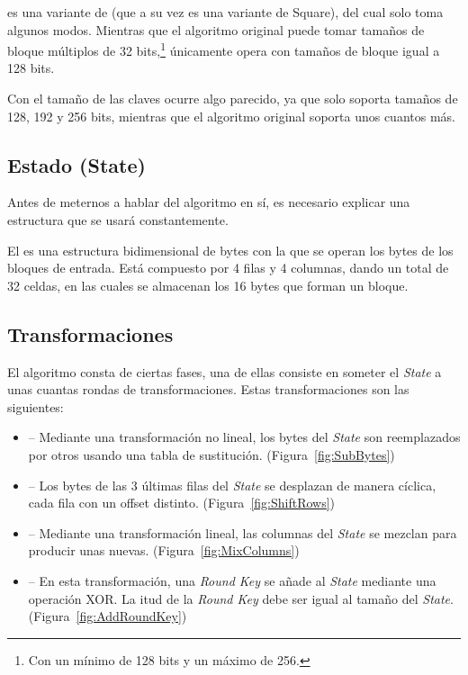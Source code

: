   es una variante de  (que a su vez es una variante de Square), del cual solo toma algunos modos.
 Mientras que el algoritmo original puede tomar tamaños de bloque múltiplos de 32 bits,\footnote{Con un mínimo de 128 bits y un máximo de 256.}
  únicamente opera con tamaños de bloque igual a 128 bits.

 Con el tamaño de las claves ocurre algo parecido, ya que  solo soporta tamaños de 128, 192 y 256 bits,
 mientras que el algoritmo original soporta unos cuantos más. \emph{\parencite{Reference25}}

 \subsection{Estado (State)}

 Antes de meternos a hablar del algoritmo en sí, es necesario explicar una estructura que se usará
 constantemente.

 El  es una estructura bidimensional de bytes con la que se operan los bytes
 de los bloques de entrada. Está compuesto por 4 filas y 4 columnas, dando un total de 32 celdas,
 en las cuales se almacenan los 16 bytes que forman un bloque. \emph{\parencite{Reference26}}

 \subsection{Transformaciones}

 El algoritmo consta de ciertas fases, una de ellas consiste en someter el \emph{State}
 a unas cuantas rondas de transformaciones. Estas transformaciones son las siguientes:

 \begin{itemize}
 \item {} -- Mediante una transformación no lineal,
 los bytes del \emph{State} son reemplazados por otros usando una tabla de sustitución.
 (Figura~\ref{fig:SubBytes})

 \item {} -- Los bytes de las 3 últimas filas del \emph{State}
 se desplazan de manera cíclica, cada fila con un offset distinto.
 (Figura~\ref{fig:ShiftRows})

 \item {} -- Mediante una transformación lineal,
 las columnas del \emph{State} se mezclan para producir unas nuevas.
 (Figura~\ref{fig:MixColumns})

 \item {} -- En esta transformación, una \emph{Round Key} se
 añade al \emph{State} mediante una operación XOR.
 La itud de la \emph{Round Key} debe ser igual al tamaño del \emph{State}.
 (Figura~\ref{fig:AddRoundKey})

 \end{itemize}

